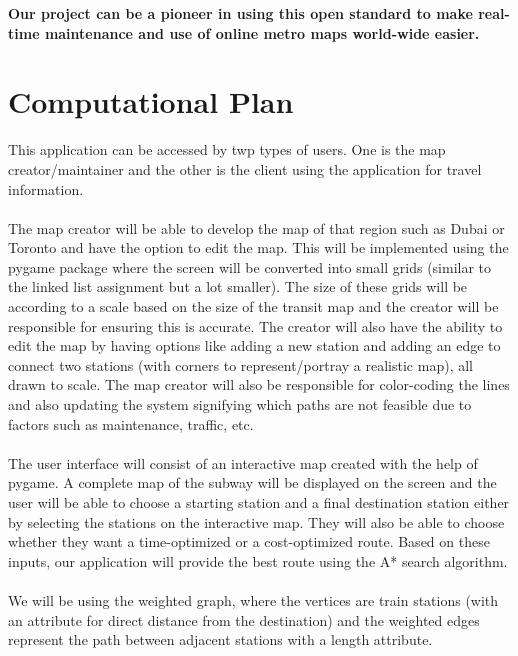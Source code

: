 \documentclass[fontsize=11pt]{article}
\begin{document}
\textbf{
Our project can be a pioneer in using this open standard to make real-time maintenance and use of online metro maps world-wide easier.
}\newline


\section*{Computational Plan}
This application can be accessed by twp types of users. One is the map creator/maintainer and the other is the client using the application for travel information.\\
\\
The map creator will be able to develop the map of that region such as Dubai or Toronto and have the option to edit the map. This will be implemented using the pygame package where the screen will be converted into small grids (similar to the linked list assignment but a lot smaller). The size of these grids will be according to a scale based on the size of the transit map and the creator will be responsible for ensuring this is accurate. The creator will also have the ability to edit the map by having options like adding a new station and adding an edge to connect two stations (with corners to represent/portray a realistic map), all drawn to scale. The map creator will also be responsible for color-coding the lines and also updating the system signifying which paths are not feasible due to factors such as maintenance, traffic, etc. \\
\\
The user interface will consist of an interactive map created with the help of pygame. A complete map of the subway will be displayed on the screen and the user will be able to choose a starting station and a final destination station either by selecting the stations on the interactive map. They will also be able to choose whether they want a time-optimized or a cost-optimized route. Based on these inputs, our application will provide the best route using the A* search algorithm.\\
 \\
We will be using the weighted graph, where the vertices are train stations (with an attribute for direct distance from the destination) and the weighted edges represent the path between adjacent stations with a length attribute. \\
\\
\end{document}
